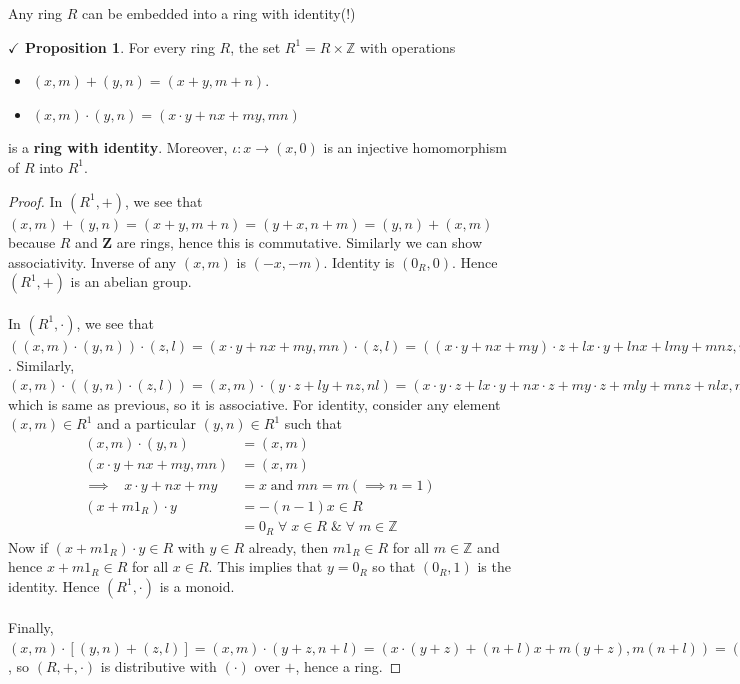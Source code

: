 \documentclass{article}
\theoremstyle{definition}
\theoremstyle{remark}
\theoremstyle{definition}
\theoremstyle{definition}
\newtheorem{proposition}{$\checkmark$ Proposition}
\theoremstyle{definition}
\theoremstyle{proof}
\begin{document}
Any ring $ R $ can be embedded into a ring with identity(!)
\begin{proposition}
	For every ring $ R $, the set $ R^1 = R\times \mathbb{Z} $ with operations
	\begin{itemize}
		\item{$ (x,m) + (y,n) = (x+y,m+n)$.}
		\item{$ (x,m)\cdot (y,n) = (x\cdot y + nx + my, mn) $}
	\end{itemize}
is a \textbf{ring with identity}. Moreover, $ \iota : x \to (x,0)$ is an injective homomorphism of $ R $ into $ R^1 $.
\end{proposition}
\begin{proof}
	In $ (R^1, +) $, we see that $ (x,m) + (y,n) = (x+y,m+n) = (y+x, n+m) = (y,n) + (x,m) $ because $ R $ and $ \mathbf{Z} $ are rings, hence this is commutative. Similarly we can show associativity. Inverse of any $ (x,m) $ is $ (-x,-m) $. Identity is $ (0_R, 0) $. Hence $ (R^1,+) $ is an abelian group.\\\\
	In $ (R^1, \cdot) $, we see that $ ((x,m)\cdot (y,n) )\cdot (z,l) = (x\cdot y + nx + my, mn) \cdot (z,l) = ((x\cdot y + nx + my)\cdot z + lx\cdot y + lnx + lmy + mnz, mnl) = (x\cdot y\cdot z + nx\cdot z + my\cdot z + lx\cdot y + lnx + lmy + mnz, mnl ) $. Similarly, $ (x,m)\cdot ((y,n) \cdot (z,l)) = (x,m)\cdot (y\cdot z + ly + nz,nl) = (x\cdot y\cdot z + lx\cdot y + nx\cdot z + my\cdot z + mly + mnz + nlx, mnl) $ which is same as previous, so it is associative. For identity, consider any element $ (x,m) \in R^1$ and a particular $ (y,n)\in R^1 $ such that 
	\begin{equation*}
		\begin{split}
			(x,m)\cdot (y,n) &= (x,m)\\
			(x\cdot y + nx + my, mn) &= (x,m)\\
			\implies\;\;\;x\cdot y + nx + my &= x\;\text{and}\;mn = m(\implies n =1)\\
			(x+ m1_R)\cdot y&= -(n-1)x \in R\\
			&= 0_R \;\forall\;x\in R \;\& \;\forall\;m\in \mathbb{Z}
		\end{split}
	\end{equation*}
Now if $ (x+m1_R)\cdot y \in R$ with $ y\in R $ already, then $ m1_R \in R$ for all $ m\in \mathbb{Z} $ and hence $ x+m1_R \in R $ for all $ x\in R $. This implies that $ y = 0_R $ so that $ (0_R, 1) $ is the identity. Hence $ (R^1,\cdot) $ is a monoid.\\\\
	Finally, $ (x,m) \cdot \left [(y,n) + (z,l)\right ] = (x,m)\cdot \left( y+z, n+l\right ) = (x\cdot (y+z) + (n+l)x + m(y+z), m(n+l)) = (x\cdot y + nx + my + x\cdot z + lx + mz, mn + nl) = (x,m)\cdot (y,n) + (x,m)\cdot (z,l)$, so $ (R,+,\cdot) $ is distributive with $ (\cdot) $ over $ + $, hence a ring.
\end{proof}
\hrulefill
\end{document}
